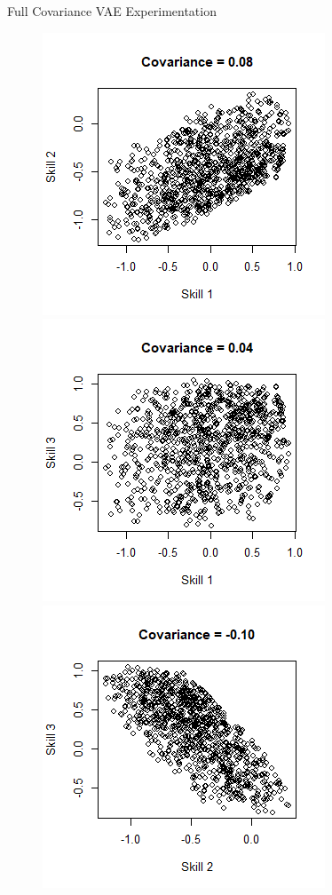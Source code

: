 \documentclass{beamer}
\theoremstyle{definition}
\begin{document}
\begin{frame}{Full Covariance VAE Experimentation}
\begin{figure}
\centering
{}
    \includegraphics[width=.75\textwidth]{img/cov_1v2.png}
\endminipage
\hfill
{}
    \includegraphics[width=.75\textwidth]{img/cov_1v3.png}
\endminipage
\hfill
{}
    \includegraphics[width=.75\textwidth]{img/cov_2v3.png}

\end{figure}
\end{frame}
\end{document}
